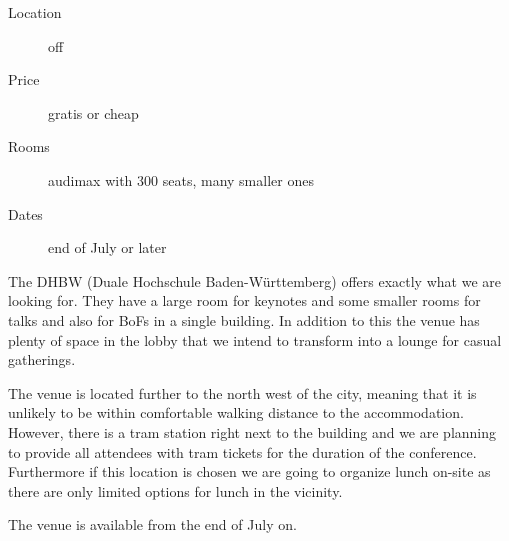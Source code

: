 

\begin{description}
\item[Location] off
\item[Price] gratis or cheap
\item[Rooms] audimax with 300 seats, many smaller ones
\item[Dates] end of July or later
\end{description}

The DHBW (Duale Hochschule Baden-Württemberg) offers exactly what we are looking for.
They have a large room for keynotes and some smaller rooms for talks and
also for BoFs in a single building. In addition to this the venue has
plenty of space in the lobby that we intend to transform into a lounge for
casual gatherings.

The venue is located further to the north west of the city, meaning that it is
unlikely to be within comfortable walking distance to the accommodation. However,
there is a tram station right next to the building and we are planning
to provide all attendees with tram tickets for the duration of the
conference. Furthermore if this location is chosen we are going to organize
lunch on-site as there are only limited options for lunch in the vicinity.

The venue is available from the end of July on.

\newpage

